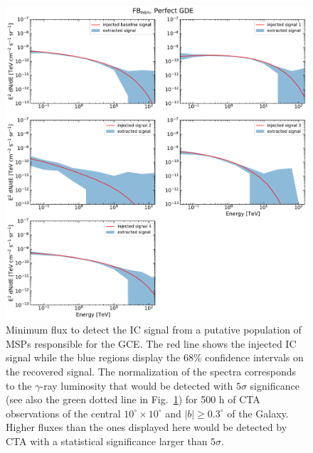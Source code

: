 \documentclass[doublespace,nopageskip]{VTthesis} %
\begin{document}
\begin{figure}
\begin{center}
{    }\label{fig:Injection_perfectGDE}
    \end{center}
\end{figure}

\begin{figure}
    \begin{center}
    \includegraphics[scale = 0.48]{Figures/CTA/all-signal-spectra-mis-False-Fermi-min-True.pdf}
    \caption{Minimum flux to detect the IC signal from a putative population of MSPs responsible for the GCE. The red line shows the injected IC signal while the blue regions display the 68\% confidence intervals on the recovered signal. The normalization of the spectra corresponds to the $\gamma$-ray luminosity that would be detected with $5\sigma$ significance (see also the green dotted line in Fig.~\ref{fig:Injection_perfectGDE}) for 500 h of CTA observations of the central $10^\circ\times10^\circ$ and $|b|\geq0.3^\circ$ of the Galaxy. Higher fluxes than the ones displayed here would be detected by CTA with a statistical significance larger than $5\sigma$.      }\label{fig:RecoveredSpectrum_perfectGDEFBmin}
    \end{center}
\end{figure}
\end{document}
